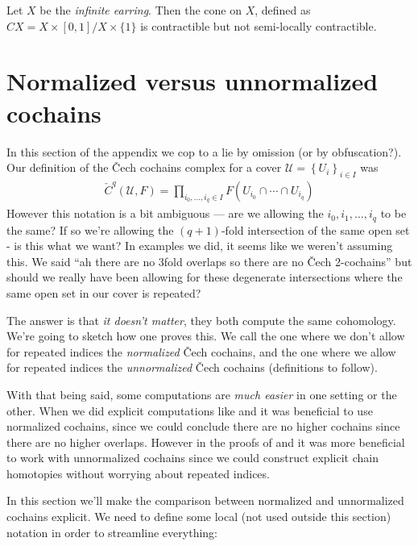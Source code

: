 \documentclass[11pt]{book}
\begin{document}
\begin{example} Let $X$ be the \emph{infinite earring}. Then the cone on $X$, defined as $CX = X \times [0,1] / X \times \{1\}$ is contractible but not semi-locally contractible.
\end{example}

\section{Normalized versus unnormalized cochains}

In this section of the appendix we cop to a lie by omission (or by obfuscation?). Our definition of the \v{C}ech cochains complex for a cover $\mathcal{U}=\left\{ U_i \right\}_{i\in I}$ was
\begin{align*}
    \check{C}^q(\mathcal{U},F) = \prod_{i_0, \ldots, i_q\in I} F(U_{i_0}\cap \cdots \cap U_{i_q})
\end{align*}
However this notation is a bit ambiguous --- are we allowing the $i_0,i_1, \ldots, i_q$ to be the same? If so we're allowing the $(q+1)$-fold intersection of the same open set - is this what we want? In examples we did, it seems like we weren't assuming this. We said ``ah there are no 3fold overlaps so there are no \v{C}ech 2-cochains'' but should we really have been allowing for these degenerate intersections where the same open set in our cover is repeated?

The answer is that \emph{it doesn't matter}, they both compute the same cohomology. We're going to sketch how one proves this. We call the one where we don't allow for repeated indices the \emph{normalized} \v{C}ech cochains, and the one where we allow for repeated indices the \emph{unnormalized} \v{C}ech cochains (definitions to follow).

With that being said, some computations are \emph{much easier} in one setting or the other. When we did explicit computations like  and  it was beneficial to use normalized cochains, since we could conclude there are no higher cochains since there are no higher overlaps. However in the proofs of  and  it was more beneficial to work with unnormalized cochains since we could construct explicit chain homotopies without worrying about repeated indices.

In this section we'll make the comparison between normalized and unnormalized cochains explicit. We need to define some local (not used outside this section) notation in order to streamline everything:
\end{document}
